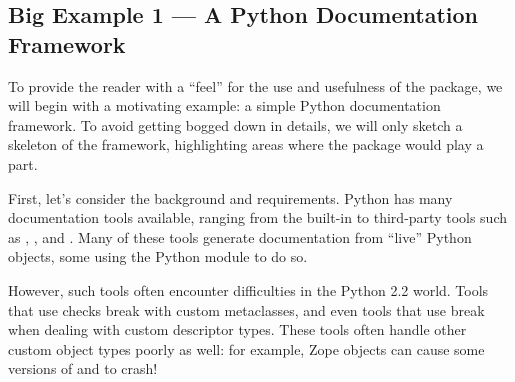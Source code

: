 \begin{seealso}


\end{seealso}



































\subsection{Big Example 1 --- A Python Documentation Framework\label{protocols-example1}}

To provide the reader with a ``feel'' for the use and usefulness of the
 package, we will begin with a motivating example: a simple
Python documentation framework.  To avoid getting bogged down in details, we
will only sketch a skeleton of the framework, highlighting areas where the
 package would play a part.

First, let's consider the background and requirements.  Python has many
documentation tools available, ranging from the built-in  to
third-party tools such as , , and
.  Many of these tools generate documentation from ``live''
Python objects, some using the Python  module to do so.

However, such tools often encounter difficulties in the Python 2.2 world.
Tools that use  checks break with custom metaclasses, and even
tools that use  break when dealing with custom
descriptor types.  These tools often handle other custom object types poorly as
well: for example, Zope  objects can cause some versions of
 and  to crash!

